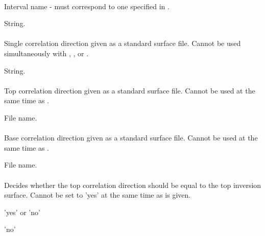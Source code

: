 \paragraph{}
 \slist
   \item \Description Interval name - must correspond to one specified in .
   \item \Argument String.
   \item \Default
 \elist

\paragraph{}
 \slist
   \item \Description Single correlation direction given as a standard surface file. Cannot be used simultaneously with , ,  or .
   \item \Argument String.
   \item \Default
 \elist

\paragraph{}
 \slist
   \item \Description Top correlation direction given as a standard surface file. Cannot be used at the same time as .
   \item \Argument File name.
   \item \Default
 \elist

\paragraph{}
 \slist
   \item \Description Base correlation direction given as a standard surface file. Cannot be used at the same time as .
   \item \Argument File name.
   \item \Default
 \elist

\paragraph{}
 \slist
   \item \Description Decides whether the top correlation direction should be equal to the top inversion surface. Cannot be set to 'yes' at the same time as  is given.
   \item \Argument 'yes' or 'no'
   \item \Default 'no'
 \elist

